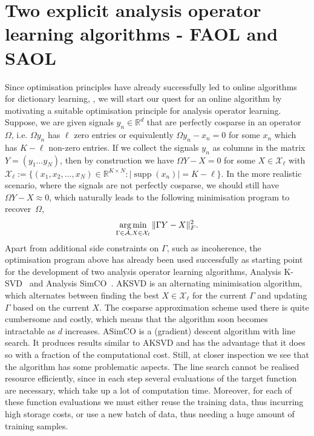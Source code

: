 \documentclass[11pt, onecolumn, journal,compsoc]{IEEEtran}
\newcommand{\R}{{\mathbb{R}}}
\DeclareMathOperator*{\argmin}{\text{arg\,min}}
\newcommand{\supp}{\operatorname{supp}}
\newcommand{\Acal}{\mathcal{A}}
\newcommand{\Xcal}{\mathcal{X}}
\theoremstyle{plain}
\theoremstyle{remark}
\begin{document}
\section{Two explicit analysis operator learning algorithms - FAOL and SAOL}\label{sec:cheap}
Since optimisation principles have already successfully led to online algorithms for dictionary learning, \cite{sc14b, sc15}, we will start our quest for an online algorithm by motivating a suitable optimisation principle for analysis operator learning. Suppose, we are given signals $y_n\in \R^d$ that are perfectly cosparse in an operator $\Omega$, i.e.
$\Omega y_n$ has $\ell$ zero entries or equivalently $\Omega y_n - x_n = 0$ for some $x_n$ which has $K-\ell$ non-zero entries. 
If we collect the signals $y_n$ as columns in the matrix $Y=(y_1 \ldots y_N)$, then by construction we have $\Omega Y - X=0$ for some $X \in \Xcal_\ell$ with $\Xcal_\ell:= \{(x_1,x_2,\ldots,x_N)\in \R^{K\times N} \colon |\supp(x_n)| = K-\ell\}$. In the more realistic scenario, where the signals are not perfectly cosparse, we should still have $\Omega Y - X\approx 0$, which naturally leads to the following minimisation program to recover~$\Omega$,
\vspace{-.05cm}\begin{align}\label{eq:AOLcheap2}
\argmin_{\Gamma \in \Acal, X\in \Xcal_\ell} \| \Gamma Y - X\|_F^2.
\end{align}
Apart from additional side constraints on $\Gamma$, such as incoherence, the optimisation program above has already been used successfully as starting point for the development of two analysis operator learning algorithms, Analysis K-SVD~\cite{rupeel13} and Analysis SimCO~\cite{dowada14, dowadaplha16}. AKSVD is an alternating minimisation algorithm, which alternates between finding the best $X \in \Xcal_\ell$ for the current $\Gamma$ and updating $\Gamma$ based on the current $X$. The cosparse approximation scheme used there is quite cumbersome and costly, which means that the algorithm soon becomes intractable as $d$ increases.
ASimCO is a (gradient) descent algorithm with line search. It produces results similar to AKSVD and has the advantage that it does so with a fraction of the computational cost. Still, at closer inspection we see that the algorithm has some problematic aspects. 
The line search cannot be realised resource efficiently, since in each step several evaluations of the target function are necessary, which take up a lot of computation time. Moreover, for each of these function evaluations we must either reuse the training data, thus incurring high storage costs, or use a new batch of data, thus needing a huge amount of training samples. 
\end{document}

